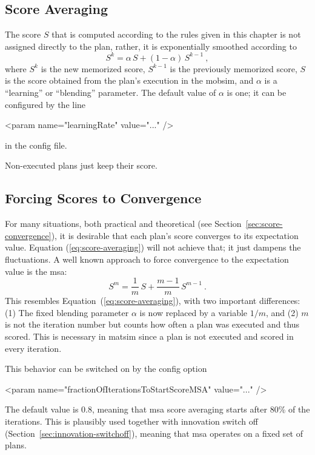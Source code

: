 \subsection{Score Averaging}
\label{sec:score-averaging}

The score $S$ that is computed according to the rules given in this chapter is not assigned directly to the plan, rather, it is exponentially smoothed according to
\begin{equation}
S^k = \alpha \, S + (1-\alpha) \, S^{k-1} \ ,  
\label{eq:score-averaging}
\end{equation}
where $S^k$ is the new memorized score, $S^{k-1}$ is the previously memorized score, $S$ is the score obtained from the plan's execution in the \gls{mobsim}, and $\alpha$ is a ``learning'' or ``blending'' parameter.  The default value of $\alpha$ is one; it can be configured by the line
\begin{xml}
<param name="learningRate" value="..." />
\end{xml}
in the config file.

Non-executed plans just keep their score.

\subsection{Forcing Scores to Convergence}
\label{sec:score-msa}

For many situations, both practical and theoretical (see Section~\ref{sec:score-convergence}), it is desirable that each plan's score converges to its expectation value.  Equation (\ref{eq:score-averaging}) will not achieve that; it just dampens the fluctuations.  A well known approach to force convergence to the expectation value is the \acrfull{msa}: 
\begin{equation}
S^m = \frac{1}{m} \, S + \frac{m-1}{m} \, S^{m-1} \ .
\label{eq:score-msa}
\end{equation}
This resembles Equation~(\ref{eq:score-averaging}), with two important differences: (1) The fixed blending parameter $\alpha$ is now replaced by a variable $1/m$, and (2) $m$ is not the iteration number but counts how often a plan was executed and thus scored.  This is necessary in \gls{matsim} since a plan is not executed and scored in every iteration.

This behavior can be switched on by the config option
\begin{xml}
<param name="fractionOfIterationsToStartScoreMSA" value="..." />
\end{xml}
The default value is 0.8, meaning that \gls{msa} score averaging starts after 80\% of the iterations.  This is plausibly used together with innovation switch off (Section~\ref{sec:innovation-switchoff}), meaning that \gls{msa} operates on a fixed set of plans.



